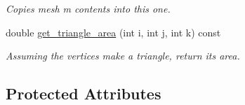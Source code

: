 \begin{DoxyCompactItemize}
\begin{DoxyCompactList}\small\item\em Copies mesh {\itshape m} contents into this one. \end{DoxyCompactList}\item 
double \hyperlink{classgeoproc_1_1TriangleMesh_acf65055f93899ce43308655fcc4d84b4}{get\+\_\+triangle\+\_\+area} (int i, int j, int k) const
\begin{DoxyCompactList}\small\item\em Assuming the vertices make a triangle, return its area. \end{DoxyCompactList}\end{DoxyCompactItemize}
\subsection*{Protected Attributes}
